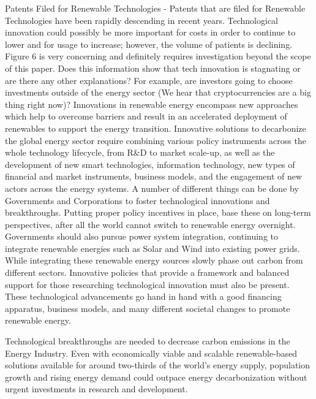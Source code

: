 \documentclass[10pt,twocolumn,letterpaper]{article}
\begin{document}
Patents Filed for Renewable Technologies - Patents that are filed for Renewable Technologies have been rapidly descending in recent years. Technological innovation could possibly be more important for costs in order to continue to lower and for usage to increase; however, the volume of patients is declining. Figure 6 is very concerning and definitely requires investigation beyond the scope of this paper. Does this information show that tech innovation is stagnating or are there any other explanations? For example, are investors going to choose investments outside of the energy sector (We hear that cryptocurrencies are a big thing right now)?
Innovations in renewable energy encompass new approaches which help to overcome barriers and result in an accelerated deployment of renewables to support the energy transition. Innovative solutions to decarbonize the global energy sector require combining various policy instruments across the whole technology lifecycle, from R&D to market scale-up, as well as the development of new smart technologies, information technology, new types of financial and market instruments, business models, and the engagement of new actors across the energy systems. A number of different things can be done by Governments and Corporations to foster technological innovations and breakthroughs. Putting proper policy incentives in place, base these on long-term perspectives, after all the world cannot switch to renewable energy overnight. Governments should also pursue power system integration, continuing to integrate renewable energies such as Solar and Wind into existing power grids. While integrating these renewable energy sources slowly phase out carbon from different sectors. Innovative policies that provide a framework and balanced support for those researching technological innovation must also be present. These technological advancements go hand in hand with a good financing apparatus, business models, and many different societal changes to promote renewable energy. 

Technological breakthroughs are needed to decrease carbon emissions in the Energy Industry. Even with economically viable and scalable renewable-based solutions available for around two-thirds of the world’s energy supply, population growth and rising energy demand could outpace energy decarbonization without urgent investments in research and development. 
\end{document}
